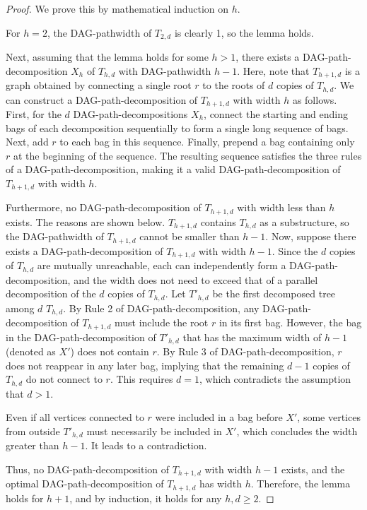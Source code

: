 \documentclass[runningheads]{llncs}
\theoremstyle{plain}
\theoremstyle{definition}
\begin{document}
\begin{proof}
    We prove this by mathematical induction on $h$. 
    
    For $h=2$, the DAG-pathwidth of $T_{2, d}$ is clearly 1, so the lemma holds. 
    
    Next, assuming that the lemma holds for some $h > 1$, there exists a DAG-path-decomposition $X_h$ of $T_{h, d}$ with DAG-pathwidth $h-1$. Here, note that $T_{h+1, d}$ is a graph obtained by connecting a single root $r$ to the roots of $d$ copies of $T_{h, d}$. We can construct a DAG-path-decomposition of $T_{h+1, d}$ with width $h$ as follows. First, for the $d$ DAG-path-decompositions $X_h$, connect the starting and ending bags of each decomposition sequentially to form a single long sequence of bags. Next, add $r$ to each bag in this sequence. Finally, prepend a bag containing only $r$ at the beginning of the sequence. The resulting sequence satisfies the three rules of a DAG-path-decomposition, making it a valid DAG-path-decomposition of $T_{h+1, d}$ with width $h$.
    
    Furthermore, no DAG-path-decomposition of $T_{h+1, d}$ with width less than $h$ exists. The reasons are shown below. $T_{h+1, d}$ contains $T_{h, d}$ as a substructure, so the DAG-pathwidth of $T_{h+1, d}$ cannot be smaller than $h-1$. Now, suppose there exists a DAG-path-decomposition of $T_{h+1, d}$ with width $h-1$. Since the $d$ copies of $T_{h, d}$ are mutually unreachable, each can independently form a DAG-path-decomposition, and the width does not need to exceed that of a parallel decomposition of the $d$ copies of $T_{h, d}$. Let $T'_{h, d}$ be the first decomposed tree among $d$ $T_{h, d}$. By Rule 2 of DAG-path-decomposition, any DAG-path-decomposition of $T_{h+1, d}$ must include the root $r$ in its first bag. However, the bag in the DAG-path-decomposition of $T'_{h, d}$ that has the maximum width of $h-1$ (denoted as $X'$) does not contain $r$. By Rule 3 of DAG-path-decomposition, $r$ does not reappear in any later bag, implying that the remaining $d-1$ copies of $T_{h, d}$ do not connect to $r$. This requires $d=1$, which contradicts the assumption that $d > 1$. 
    
    Even if all vertices connected to $r$ were included in a bag before $X'$, some vertices from outside $T'_{h, d}$ must necessarily be included in $X'$, which concludes the width greater than $h-1$. It leads to a contradiction.
    
    Thus, no DAG-path-decomposition of $T_{h+1, d}$ with width $h-1$ exists, and the optimal DAG-path-decomposition of $T_{h+1, d}$ has width $h$. Therefore, the lemma holds for $h+1$, and by induction, it holds for any $h, d \geq 2$.
    
\end{proof}
\end{document}
